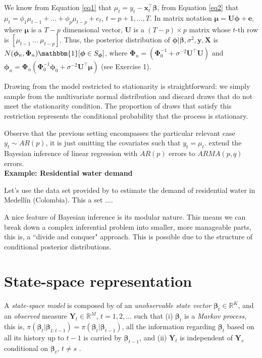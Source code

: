 We know from Equation \ref{eq1} that $\mu_t=y_t-\bm{x}_t^{\top}\bm{\beta}$, from Equation \ref{eq2} that $\mu_t=\phi_1\mu_{t-1}+\dots+\phi_p\mu_{t-p}+e_t$, $t=p+1,\dots,T$. In matrix notation $\bm{\mu}=\bm{U}\bm{\phi}+\bm{e}$, where $\bm{\mu}$ is a $T-p$ dimensional vector, $\bm{U}$ is a $(T-p)\times p$ matrix whose $t$-th row is $[\mu_{t-1} \ \dots \ \mu_{t-p}]$. Thus, the posterior distribution of $\bm{\phi}|\bm{\beta},\sigma^2,\bm{y},\bm{X}$ is $N(\bm{\phi}_n, \bm{\Phi}_n)\mathbbm{1}[\bm{\phi}\in S_{\bm{\phi}}]$, where $\bm{\Phi}_n=(\bm{\Phi}_0^{-1}+\sigma^{-2}\bm{U}^{\top}\bm{U})$ and $\bm{\phi}_n=\bm{\Phi}_n(\bm{\Phi}_0^{-1}\bm{\phi}_0+\sigma^{-2}\bm{U}^{\top}\bm{\mu})$ (see Exercise 1).

Drawing from the model restricted to stationarity is straightforward: we simply sample from the multivariate normal distribution and discard draws that do not meet the stationarity condition. The proportion of draws that satisfy this restriction represents the conditional probability that the process is stationary.

Observe that the previous setting encompasses the particular relevant case  $y_t\sim AR(p)$, it is just omitting the covariates such that $y_t=\mu_t$. \cite{chib1994bayes} extend the Bayesian inference of linear regression with $AR(p)$ errors to $ARMA(p,q)$ errors.\\

\textbf{Example: Residential water demand}

Let's use the data set provided by \cite{hassan2018effects} to estimate the demand of residential water in Medellín (Colombia). This a set ....

A nice feature of Bayesian inference is its modular nature. This means we can break down a complex inferential problem into smaller, more manageable parts, this is, a ``divide and conquer" approach. This is possible due to the structure of conditional posterior distributions.  
   
\section{State-space representation}\label{sec82}
A \textit{state-space model} is composed by of an \textit{unobservable state vector}  $\bm{\beta}_t \in \mathbb{R}^K$, and an \textit{observed} measure $\bm{Y}_t \in \mathbb{R}^M$, $t=1,2,\dots$ such that (i) $\bm{\beta}_t$ is a \textit{Markov process}, this is, $\pi(\bm{\beta}_t|\bm{\beta}_{1:t-1})=\pi(\bm{\beta}_t|\bm{\beta}_{t-1})$, all the information regarding $\bm{\beta}_t$ based on all its history up to $t-1$ is carried by $\bm{\beta}_{t-1}$, and (ii) $\bm{Y}_t$ is independent of $\bm{Y}_s$ conditional on $\bm{\beta}_t$, $t\neq s$ \cite[Chap.~2]{petris2009dynamic}.

